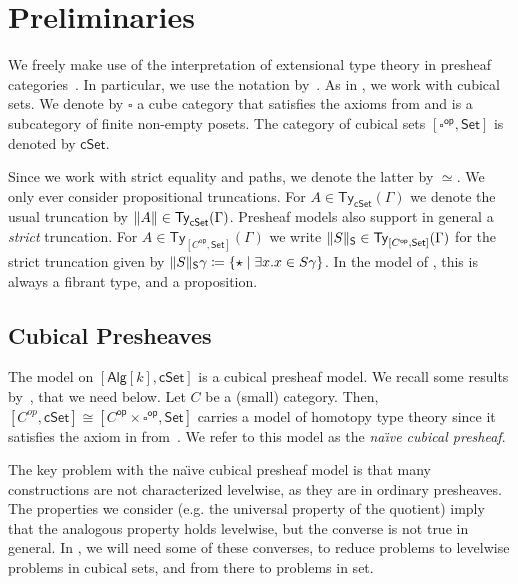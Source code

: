 \documentclass[10pt,a4paper]{article}
\theoremstyle{definition}
\theoremstyle{remark}
\newcommand{\Set}{\mathsf{Set}}
\newcommand{\cSet}{\mathsf{cSet}}
\newcommand{\Alg}{\mathsf{Alg}}
\DeclareMathOperator\op{\mathsf{op}}
\newcommand\Ty{\mathsf{Ty}}
\DeclarePairedDelimiter\set{\{}{\}}
\begin{document}
\section{Preliminaries}\label{sec:preliminaries}

We freely make use of the interpretation of extensional type theory in presheaf categories~\cite{hofmann,huber-phd-thesis}.
In particular, we use the notation by~\cite{huber-phd-thesis}.
As in \cite{draft}, we work with cubical sets.
We denote by \(\square\) a cube category that satisfies the axioms from \cite{survey} and is a subcategory of finite non-empty posets.
The category of cubical sets \([\square^{\op}, \Set]\) is denoted by \(\cSet\).

Since we work with strict equality and paths, we denote the latter by \(\simeq\).
We only ever consider propositional truncations.
For \(A \in \Ty_{\cSet}(\Gamma)\) we denote the usual truncation by \(\trunc{A} \in \Ty_{\cSet}(\Gamma)\).
Presheaf models also support in general a \emph{strict} truncation.
For \(A \in \Ty_{[C^{\op}, \Set]}(\Gamma)\) we write \(\trunc*{S} \in \Ty_{[C^{\op}, \Set]}(\Gamma)\) for the strict truncation given by \(\trunc*{S}\gamma \coloneqq \set{ \star \mid \exists x. x \in S\gamma }\).
In the model of \HoTT{}, this is always a fibrant type, and a proposition.


\subsection{Cubical Presheaves}

The model on \([\Alg[k], \cSet]\) is a cubical presheaf model.
We recall some results by~\cite{CRS21}, that we need below.
Let \(C\) be a (small) category.
Then, \([C^{op}, \cSet] \cong [C^{\op} \times \square^{\op}, \Set]\) carries a model of homotopy type theory since it satisfies the axiom in from~\cite{survey}.
We refer to this model as the \emph{na{\"\i}ve cubical presheaf}.

The key problem with the na{\"\i}ve cubical presheaf model is that many constructions are not characterized levelwise, as they are in ordinary presheaves.
The properties we consider (e.g. the universal property of the quotient) imply that the analogous property holds levelwise, but the converse is not true in general.
In , we will need some of these converses, to reduce problems to levelwise problems in cubical sets, and from there to problems in set.
\end{document}
